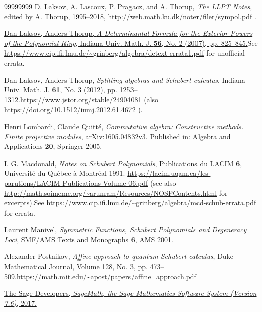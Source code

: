 \documentclass[numbers=enddot,12pt,final,onecolumn,notitlepage]{scrartcl}%
\theoremstyle{definition}
\begin{document}
\begin{thebibliography}{99999999}
D. Laksov, A. Lascoux, P. Pragacz, and A. Thorup,
\textit{The LLPT Notes}, edited by A. Thorup, 1995--2018,\newline%
\url{http://web.math.ku.dk/noter/filer/sympol.pdf} .

\href{https://www.jstor.org/stable/24902713}{Dan
Laksov, Anders Thorup, \textit{A Determinantal Formula for the Exterior Powers
of the Polynomial Ring}, Indiana Univ. Math. J. \textbf{56}, No. 2 (2007), pp.
825--845.}\newline See
\url{https://www.cip.ifi.lmu.de/~grinberg/algebra/detext-errata1.pdf} for
unofficial errata.

Dan Laksov, Anders Thorup, \textit{Splitting
algebras and Schubert calculus}, Indiana Univ. Math. J. \textbf{61}, No. 3
(2012), pp. 1253--1312.\newline\url{https://www.jstor.org/stable/24904081}
(also \url{https://doi.org/10.1512/iumj.2012.61.4672} ).

\href{https://arxiv.org/abs/1605.04832v3}{Henri
Lombardi, Claude Quitt\'{e}, \textit{Commutative algebra: Constructive
methods. Finite projective modules}, arXiv:1605.04832v3}. Published in:
Algebra and Applications \textbf{20}, Springer 2005.

I. G. Macdonald, \textit{Notes on Schubert
Polynomials}, Publications du LACIM \textbf{6}, Universit\'{e} du Qu\'{e}bec
\`{a} Montr\'{e}al 1991.\newline%
\url{https://lacim.uqam.ca/les-parutions/LACIM-Publications-Volume-06.pdf}\newline%
(see also \url{http://math.soimeme.org/~arunram/Resources/NOSPContents.html}
for excerpts).\newline See
\url{https://www.cip.ifi.lmu.de/~grinberg/algebra/mcd-schub-errata.pdf} for errata.

Laurent Manivel, \textit{Symmetric Functions,
Schubert Polynomials and Degeneracy Loci}, SMF/AMS Texts and Monographs
\textbf{6}, AMS 2001.

Alexander Postnikov, \textit{Affine approach to
quantum Schubert calculus}, Duke Mathematical Journal, Volume 128, No. 3, pp.
473--509.\newline\url{https://math.mit.edu/~apost/papers/affine_approach.pdf}

\href{http://www.sagemath.org}{The Sage
Developers, \textit{SageMath, the Sage Mathematics Software System (Version
7.6)}, 2017.}


\end{thebibliography}
\end{document}
